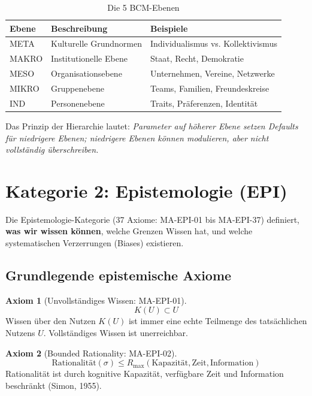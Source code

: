 \documentclass[11pt,a4paper]{article}
\theoremstyle{definition}
\newtheorem{axiom}{Axiom}[section]
\theoremstyle{plain}
\begin{document}
\begin{table}[h]
\centering
\caption{Die 5 BCM-Ebenen}
\label{tab:ebenen}
\begin{tabular}{@{}lll@{}}
\toprule
\textbf{Ebene} & \textbf{Beschreibung} & \textbf{Beispiele} \\
\midrule
META & Kulturelle Grundnormen & Individualismus vs. Kollektivismus \\
MAKRO & Institutionelle Ebene & Staat, Recht, Demokratie \\
MESO & Organisationsebene & Unternehmen, Vereine, Netzwerke \\
MIKRO & Gruppenebene & Teams, Familien, Freundeskreise \\
IND & Personenebene & Traits, Präferenzen, Identität \\
\bottomrule
\end{tabular}
\end{table}

Das Prinzip der Hierarchie lautet: \textit{Parameter auf höherer Ebene setzen Defaults für niedrigere Ebenen; niedrigere Ebenen können modulieren, aber nicht vollständig überschreiben.}

\section{Kategorie 2: Epistemologie (EPI)}

Die Epistemologie-Kategorie (37 Axiome: MA-EPI-01 bis MA-EPI-37) definiert, \textbf{was wir wissen können}, welche Grenzen Wissen hat, und welche systematischen Verzerrungen (Biases) existieren.

\subsection{Grundlegende epistemische Axiome}

\begin{axiom}[Unvollständiges Wissen: MA-EPI-01]
\begin{equation}
K(U) \subset U
\end{equation}
Wissen über den Nutzen $K(U)$ ist immer eine echte Teilmenge des tatsächlichen Nutzens $U$. Vollständiges Wissen ist unerreichbar.
\end{axiom}

\begin{axiom}[Bounded Rationality: MA-EPI-02]
\begin{equation}
\text{Rationalität}(\sigma) \leq R_{\max}(\text{Kapazität}, \text{Zeit}, \text{Information})
\end{equation}
Rationalität ist durch kognitive Kapazität, verfügbare Zeit und Information beschränkt (Simon, 1955).
\end{axiom}
\end{document}
